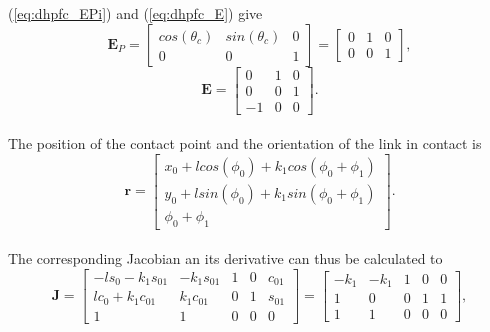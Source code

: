 (\ref{eq:dhpfc_EPi}) and (\ref{eq:dhpfc_E}) give
\begin{equation}
    \mathbf{E}_P = 
    \begin{bmatrix}
        cos(\theta_c) & sin(\theta_c) & 0 \\
        0 & 0 & 1
    \end{bmatrix}=
    \begin{bmatrix}
        0 & 1 & 0 \\
        0 & 0 & 1
    \end{bmatrix},
\end{equation}
\begin{equation}
    \mathbf{E}=
    \begin{bmatrix}
        0 & 1 & 0 \\
        0 & 0 & 1 \\
        -1 & 0 & 0
    \end{bmatrix}.
\end{equation}
\\
The position of the contact point and the orientation of the link in contact is
\begin{equation}
    \mathbf{r}=
    \begin{bmatrix}
        x_0 + l cos(\phi_0) + k_1 cos(\phi_0+\phi_1)\\
        y_0 + l sin(\phi_0) + k_1 sin(\phi_0+\phi_1)\\
        \phi_0+\phi_1
    \end{bmatrix}.
\end{equation}
\\
The corresponding Jacobian an its derivative can thus be calculated to
\begin{equation}
    \mathbf{J}=
    \begin{bmatrix}
        -l s_0 - k_1 s_{01} & - k_1 s_{01} & 1 & 0 & c_{01} \\
        l c_0 + k_1 c_{01} & k_1 c_{01} & 0 & 1 & s_{01} \\
        1 & 1 & 0 & 0 & 0
    \end{bmatrix}=
    \begin{bmatrix}
        - k_1 & - k_1 & 1 & 0 & 0 \\
        1 &0 & 0 & 1 & 1 \\
        1 & 1 & 0 & 0 & 0
    \end{bmatrix},
\end{equation}
